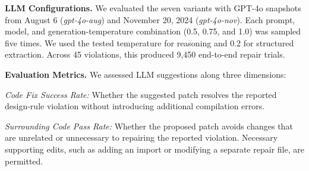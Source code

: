 \textbf{LLM Configurations.}
We evaluated the seven variants with GPT-4o snapshots from August 6
(\textit{gpt-4o-aug}) and November 20, 2024
(\textit{gpt-4o-nov}). Each prompt, model, and generation-temperature
combination (0.5, 0.75, and 1.0) was sampled five times. We used the 
tested temperature for reasoning and 0.2 for structured extraction.
Across 45 violations, this produced 9,450 end-to-end repair
trials.

\textbf{Evaluation Metrics.} We assessed LLM suggestions along three dimensions:

\textit{Code Fix Success Rate:} Whether the suggested patch resolves
the reported design-rule violation without introducing additional
compilation errors.

\textit{Surrounding Code Pass Rate:} Whether the proposed patch avoids
changes that are unrelated or unnecessary to repairing the reported
violation. Necessary supporting edits, such as adding an import or
modifying a separate repair file, are permitted. 

